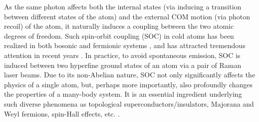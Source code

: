 \documentclass[atoms,article,submit,moreauthors,pdftex,12pt,a4paper]{mdpi}
\begin{document}

As the same photon affects both the internal states (via inducing a transition between different states of the atom) and the external COM motion (via photon recoil) of the atom, it naturally induces a coupling between the two atomic degrees of freedom. Such spin-orbit coupling (SOC) in cold atoms has been realized in both bosonic \cite{soc1, soc2} and fermionic systems \cite{soc3, soc4}, and has attracted tremendous attention in recent years \cite{socVictor}. In practice, to avoid spontaneous emission, SOC is induced between two hyperfine ground states of an atom via a pair of Raman laser beams. Due to its non-Abelian nature, SOC not only significantly affects the physics of a single atom, but, perhaps more importantly, also profoundly changes the properties of a many-body system. It is an essential ingredient underlying such diverse phenomena as topological superconductors/insulators, Majorana and Weyl fermions, spin-Hall effects, etc. \cite{TI, MF, WF, SHE1, SHE2}. 
\end{document}
